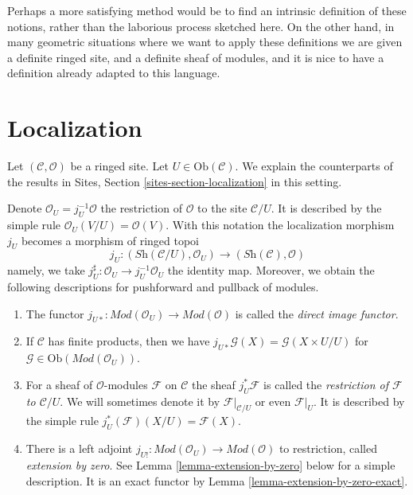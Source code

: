 \medskip\noindent
Perhaps a more satisfying method would be to find an intrinsic definition
of these notions, rather than the laborious process sketched here.
On the other hand, in many geometric situations where we want to apply
these definitions we are given a definite ringed site, and a definite
sheaf of modules, and it is nice to have a definition already adapted to
this language.




\section{Localization}
\label{section-localization}

\noindent
Let $(\mathcal{C}, \mathcal{O})$ be a ringed site.
Let $U \in \text{Ob}(\mathcal{C})$.
We explain the counterparts of the results in
Sites, Section \ref{sites-section-localization} in this setting.

\medskip\noindent
Denote
$\mathcal{O}_U = j_U^{-1}\mathcal{O}$ the restriction of $\mathcal{O}$
to the site $\mathcal{C}/U$. It is described by the simple
rule $\mathcal{O}_U(V/U) = \mathcal{O}(V)$. With this notation
the localization morphism $j_U$ becomes a morphism of ringed topoi
$$
j_U :
(\textit{Sh}(\mathcal{C}/U), \mathcal{O}_U)
\longrightarrow
(\textit{Sh}(\mathcal{C}), \mathcal{O})
$$
namely, we take $j_U^\sharp : \mathcal{O}_U \to j_U^{-1}\mathcal{O}_U$
the identity map.
Moreover, we obtain the following descriptions for pushforward
and pullback of modules.
\begin{enumerate}
\item The functor
$j_{U*} : \textit{Mod}(\mathcal{O}_U) \to \textit{Mod}(\mathcal{O})$
is called the {\it direct image functor}.
\item If $\mathcal{C}$ has finite products, then we have
$j_{U*}\mathcal{G}(X) = \mathcal{G}(X \times U/U)$ for
$\mathcal{G} \in \text{Ob}(\textit{Mod}(\mathcal{O}_U))$.
\item For a sheaf of $\mathcal{O}$-modules $\mathcal{F}$ on $\mathcal{C}$
the sheaf $j_U^*\mathcal{F}$ is called the
{\it restriction of $\mathcal{F}$ to $\mathcal{C}/U$}.
We will sometimes denote it by
$\mathcal{F}|_{\mathcal{C}/U}$ or even $\mathcal{F}|_U$.
It is described by the simple rule $j_U^*(\mathcal{F})(X/U) = \mathcal{F}(X)$.
\item There is a left adjoint
$j_{U!} : \textit{Mod}(\mathcal{O}_U) \to \textit{Mod}(\mathcal{O})$
to restriction, called {\it extension by zero}. See
Lemma \ref{lemma-extension-by-zero} below for a simple description.
It is an exact functor by Lemma \ref{lemma-extension-by-zero-exact}.
\end{enumerate}

